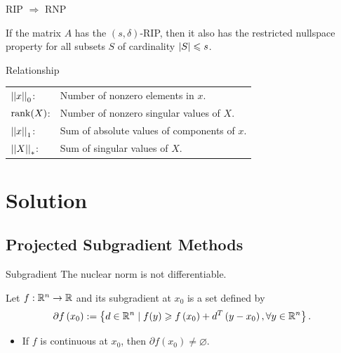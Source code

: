 \documentclass{beamer}
\begin{document}
\begin{frame}{RIP \(\Rightarrow\) RNP}
    \begin{theorem}
        If the matrix \(A\) has the \((s,\delta)\)-RIP, then it also has the restricted nullspace property for all subsets \(S\) of cardinality \(\left|S\right|\leqslant s\).
    \end{theorem}
\end{frame}

\begin{frame}{Relationship}
    \begin{center}
        \begin{tabular}{|ll|}
            \hline
            \(\left|\left|x\right|\right|_0\): & Number of nonzero elements in \(x\).\\
            \(\operatorname{rank}(X)\): & Number of nonzero singular values of \(X\).\\
            \hline\hline
            \(\left|\left|x\right|\right|_1\): & Sum of absolute values of components of \(x\).\\
            \(\left|\left|X\right|\right|_\ast\): & Sum of singular values of \(X\).\\
            \hline
        \end{tabular}
    \end{center}
\end{frame}

\section{Solution}

\subsection{Projected Subgradient Methods}

\begin{frame}{Subgradient}
    The nuclear norm is not differentiable.
    \pause
    \begin{definition}[Subgradient]
        Let \(f:\mathbb R^n\to\mathbb R\) and its subgradient at \(x_0\) is a set defined by
        \[\partial f\left(x_0\right):=\left\{d\in\mathbb R^n\mid f(y)\geqslant f\left(x_0\right)+d^T\left(y-x_0\right),\forall y\in\mathbb R^n\right\}.\]
    \end{definition}
    \pause
    \begin{itemize}
        \item If \(f\) is continuous at \(x_0\), then \(\partial f\left(x_0\right)\neq\varnothing\).
    \end{itemize}
\end{frame}
\end{document}
